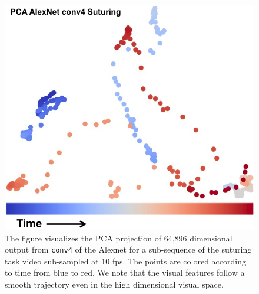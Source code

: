\begin{figure}[ht!]
\centering
\includegraphics[width=0.7\linewidth]{figures/pca_conv4.png}
\caption{The figure visualizes the PCA projection of 64,896 dimensional output from \texttt{conv4} of the Alexnet for a sub-sequence of the suturing task video sub-sampled at 10 fps. The points are colored according to time from blue to red. We note that the visual features follow a smooth trajectory even in the high dimensional visual space.   \label{fig:imgtraj}}
\vspace{-10pt}
\end{figure}